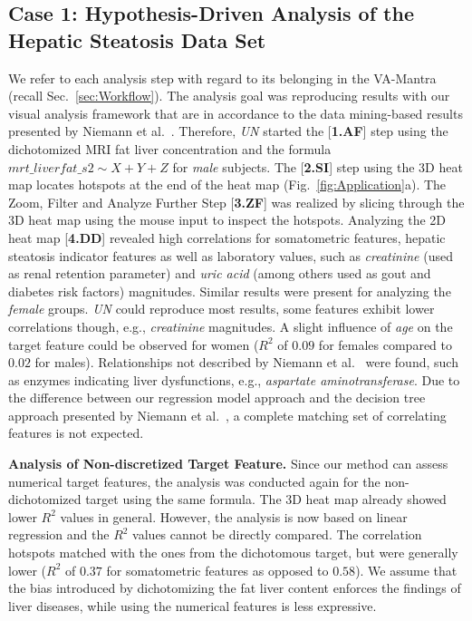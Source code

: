 \documentclass[journal]{style/vgtc} 			          %
\begin{document}
\subsection{Case 1: Hypothesis-Driven Analysis of the Hepatic Steatosis Data Set}
We refer to each analysis step with regard to its belonging in the VA-Mantra (recall Sec.~\ref{sec:Workflow}).
The analysis goal was reproducing results with our visual analysis framework that are in accordance to the data mining-based results presented by Niemann et al.~\cite{Niemann2014}.
Therefore, \emph{UN} started the [\textbf{1.AF}] step using the dichotomized MRI fat liver concentration and the formula $mrt\_liverfat\_s2 \sim X + Y + Z$ for \emph{male} subjects.
The [\textbf{2.SI}] step using the 3D heat map locates hotspots at the end of the heat map (Fig.~\ref{fig:Application}a).
The Zoom, Filter and Analyze Further Step [\textbf{3.ZF}] was realized by slicing through the 3D heat map using the mouse input to inspect the hotspots.
Analyzing the 2D heat map [\textbf{4.DD}] revealed high correlations for somatometric features, hepatic steatosis indicator features as well as laboratory values, such as \emph{creatinine} (used as renal retention parameter) and \emph{uric acid} (among others used as gout and diabetes risk factors) magnitudes.
Similar results were present for analyzing the \emph{female} groups.
\emph{UN} could reproduce most results, some features exhibit lower correlations though, e.g., \emph{creatinine} magnitudes.
A slight influence of \emph{age} on the target feature could be observed for women ($R^2$ of $0.09$ for females compared to $0.02$ for males).
Relationships not described by Niemann et al.~\cite{Niemann2014} were found, such as enzymes indicating liver dysfunctions, e.g., \emph{aspartate aminotransferase}.
%
Due to the difference between our regression model approach and the decision tree approach presented by Niemann et al.~\cite{Niemann2014}, a complete matching set of correlating features is not expected.

\textbf{Analysis of Non-discretized Target Feature.}
Since our method can assess numerical target features, the analysis was conducted again for the non-dichotomized target using the same formula.
The 3D heat map already showed lower $R^2$ values in general.
However, the analysis is now based on linear regression and the $R^2$ values cannot be directly compared.
The correlation hotspots matched with the ones from the dichotomous target, but were generally lower ($R^2$ of $0.37$ for somatometric features as opposed to $0.58$).
We assume that the bias introduced by dichotomizing the fat liver content enforces the findings of liver diseases, while using the numerical features is less expressive.
\end{document}
